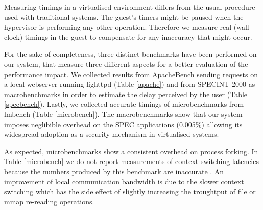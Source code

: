 Measuring timings in a virtualised environment differs from the usual procedure used with traditional systems. The guest's timers might be paused when the hypervisor is performing any other operation. Therefore we measure real (wall-clock) timings in the guest to compensate for any inaccuracy that might occur.

For the sake of completeness, three distinct benchmarks have been performed on our system, that measure three different aspects for a better evaluation of the performance impact.
We collected results from ApacheBench \cite{apachebench} sending requests on a local webserver running lighttpd (Table \ref{apache}) and from SPECINT 2000 as macrobenchmarks in order to estimate the delay perceived by the user (Table \ref{specbench}). Lastly, we collected accurate timings of microbenchmarks from lmbench (Table \ref{microbench}). The macrobenchmarks show that our system imposes neglibible overhead on the SPEC applications (0.005\%) allowing its widespread adoption as a security mechanism in virtualised systems. 

As expected, microbenchmarks show a consistent overhead on process forking. In Table \ref{microbench} we do not report measurements of context switching latencies because the numbers produced by this benchmark are inaccurate \cite{lmbenchbug,lmbenchevil}. An improvement of local communication bandwidth is due to the slower context switching which has the side effect of slightly increasing the troughtput of file or mmap re-reading operations.  

